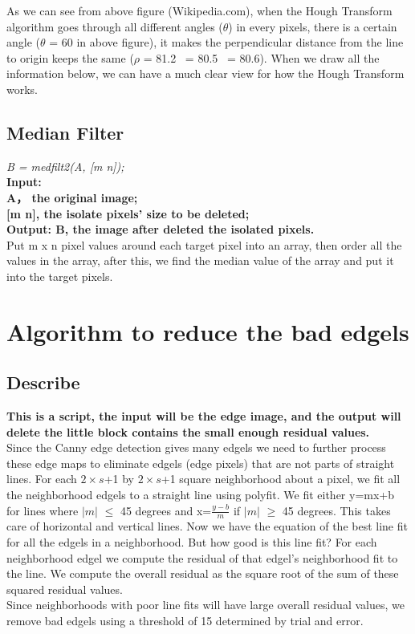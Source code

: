 As we can see from above figure (Wikipedia.com), when the Hough Transform algorithm goes through all different angles ($\theta$) in every pixels, there is a certain angle ($\theta$ = 60 in above figure), it makes the perpendicular distance from the line to origin keeps the same ($\rho$ = 81.2 ~= 80.5 ~= 80.6). When we draw all the information below, we can have a much clear view for how the Hough Transform works.\\

\subsection{Median Filter}
\vspace{3mm}
\textit{B = medfilt2(A, [m n]);}\\
\newline
\textbf{Input:\\ A， the original image;}\\
\textbf{[m n], the isolate pixels’ size to be deleted;}\\ 
\textbf{Output: B, the image after deleted the isolated pixels.}\\
\newline
Put m x n pixel values around each target pixel into an array, then order all the values in the array, after this, we find the median value of the array and put it into the target pixels.

\section{Algorithm to reduce the bad edgels}

\subsection{Describe}
\textbf{This is a script, the input will be the edge image, and the output will delete the little block contains the small enough residual values.}\\
Since the Canny edge detection gives many edgels we need to further process these edge maps to eliminate edgels (edge pixels) that are not parts of straight lines. For each $2\times s$+1 by $2\times s$+1 square neighborhood about a pixel, we fit all the neighborhood edgels to a straight line using polyfit. We fit either y=mx+b for lines where $\left|m\right|$ $\leq$ 45 degrees and x=$\frac{y-b}{m}$ if $\left|m\right|$ $\geq$ 45 degrees. This takes care of horizontal and vertical lines. Now we have the equation of the best line fit for all the edgels in a neighborhood. But how good is this line fit? For each neighborhood edgel we compute the residual of that edgel’s neighborhood fit to the line. We compute the overall residual as the square root of the sum of these squared residual values.\\
Since neighborhoods with poor line fits will have large overall residual values, we remove bad edgels using a threshold of 15 determined by trial and error.

